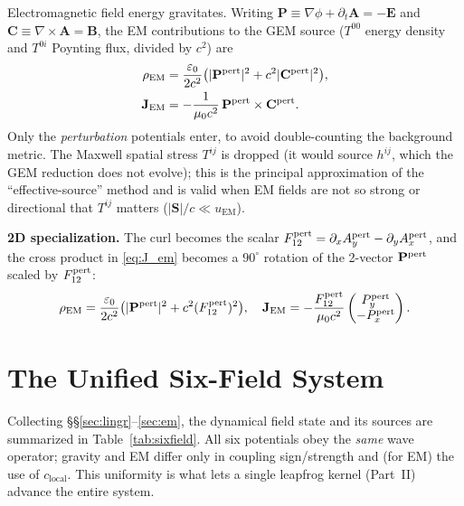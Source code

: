 \documentclass[11pt]{article}
\newcommand{\vv}[1]{\mathbf{#1}}           %
\newcommand{\clocal}{c_{\mathrm{local}}}
\begin{document}
Electromagnetic field energy gravitates. Writing $\vv{P}\equiv\nabla\phi +
\partial_t\vv{A}=-\vv{E}$ and $\vv{C}\equiv\nabla\times\vv{A}=\vv{B}$, the EM
contributions to the GEM source ($T^{00}$ energy density and $T^{0i}$ Poynting
flux, divided by $c^2$) are
\begin{align}
  \rho_{\mathrm{EM}} &= \frac{\varepsilon_0}{2c^2}\bigl(|\vv{P}^{\rm pert}|^2 +
     c^2|\vv{C}^{\rm pert}|^2\bigr), \label{eq:rho_em}\\
  \vv{J}_{\mathrm{EM}} &= -\frac{1}{\mu_0 c^2}\,\vv{P}^{\rm pert}\times\vv{C}^{\rm pert}.
     \label{eq:J_em}
\end{align}
Only the \emph{perturbation} potentials enter, to avoid double-counting the
background metric.  The Maxwell spatial stress $T^{ij}$ is dropped (it would
source $h^{ij}$, which the GEM reduction does not evolve); this is the principal
approximation of the ``effective-source'' method and is valid when EM fields are
not so strong or directional that $T^{ij}$ matters
($|\vv{S}|/c \ll u_{\mathrm{EM}}$).

\begin{twoD}
\textbf{2D specialization.} The curl becomes the scalar
$F_{12}^{\rm pert}=\partial_x A_y^{\rm pert}-\partial_y A_x^{\rm pert}$, and the
cross product in \eqref{eq:J_em} becomes a $90^\circ$ rotation of the 2-vector
$\vv{P}^{\rm pert}$ scaled by $F_{12}^{\rm pert}$:
\begin{equation}
  \rho_{\mathrm{EM}} = \frac{\varepsilon_0}{2c^2}\bigl(|\vv{P}^{\rm pert}|^2 +
     c^2 (F_{12}^{\rm pert})^2\bigr),\quad
  \vv{J}_{\mathrm{EM}} = -\frac{F_{12}^{\rm pert}}{\mu_0 c^2}
     \begin{pmatrix} P_y^{\rm pert}\\ -P_x^{\rm pert}\end{pmatrix}.
\end{equation}
\end{twoD}

\section{The Unified Six-Field System}
\label{sec:sixfield}

Collecting \S\S\ref{sec:lingr}--\ref{sec:em}, the dynamical field state and its
sources are summarized in Table~\ref{tab:sixfield}.  All six potentials obey the
\emph{same} wave operator; gravity and EM differ only in coupling sign/strength
and (for EM) the use of $\clocal$.  This uniformity is what lets a single
leapfrog kernel (Part~II) advance the entire system.
\end{document}
